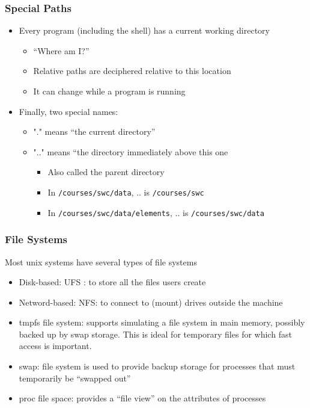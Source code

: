 \begin{frame}[fragile]\frametitle{Special Paths}
\begin{itemize}
\item Every program (including the shell) has a current working directory
\begin{itemize}
    \item “Where am I?”
    \item Relative paths are deciphered relative to this location
    \item It can change while a program is running
\end{itemize}
\item Finally, two special names:
\begin{itemize}
    \item "." means “the current directory”
    \item ".." means “the directory immediately above this one
\begin{itemize}
          \item Also called the parent directory
          \item In \lstinline!/courses/swc/data!, .. is \lstinline!/courses/swc!
          \item In \lstinline!/courses/swc/data/elements!, .. is \lstinline!/courses/swc/data!
\end{itemize}
\end{itemize}
\end{itemize}
\end{frame}

\begin{frame}\frametitle{File Systems}
Most unix systems have several types of file systems
\begin{itemize}
\item Disk-based: UFS : to store all the files users create
\item Netword-based: NFS: to connect to (mount) drives outside the machine
\item tmpfs file system: supports simulating a file system in main memory, possibly backed up by swap storage. This is ideal for temporary files for which
fast access is important.
\item swap: 
file system is used to provide backup storage for processes that must
temporarily be “swapped out”
\item  proc file space: provides a “file view” on the attributes of processes
\end{itemize}
\end{frame}

